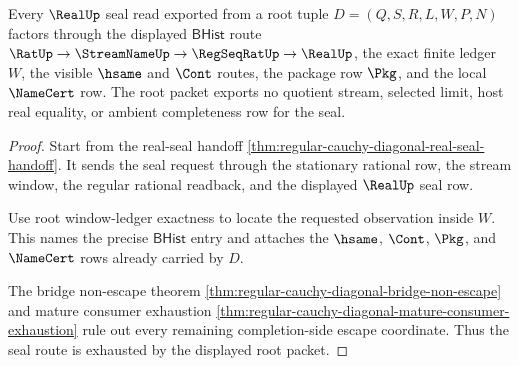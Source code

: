 \begin{theorem}
\label{thm:regular-cauchy-diagonal-root-seal-route-exhaustion}
Every $\RealUp$ seal read exported from a root tuple $D=(Q,S,R,L,W,P,N)$ factors through the displayed $\mathsf{BHist}$ route $\RatUp \to \StreamNameUp \to \RegSeqRatUp \to \RealUp$, the exact finite ledger $W$, the visible $\hsame$ and $\Cont$ routes, the package row $\Pkg$, and the local $\NameCert$ row. The root packet exports no quotient stream, selected limit, host real equality, or ambient completeness row for the seal.
\end{theorem}
\begin{proof}
Start from the real-seal handoff \autoref{thm:regular-cauchy-diagonal-real-seal-handoff}. It sends the seal request through the stationary rational row, the stream window, the regular rational readback, and the displayed $\RealUp$ seal row.

Use root window-ledger exactness to locate the requested observation inside $W$. This names the precise $\mathsf{BHist}$ entry and attaches the $\hsame$, $\Cont$, $\Pkg$, and $\NameCert$ rows already carried by $D$.

The bridge non-escape theorem \autoref{thm:regular-cauchy-diagonal-bridge-non-escape} and mature consumer exhaustion \autoref{thm:regular-cauchy-diagonal-mature-consumer-exhaustion} rule out every remaining completion-side escape coordinate. Thus the seal route is exhausted by the displayed root packet.
\end{proof}

